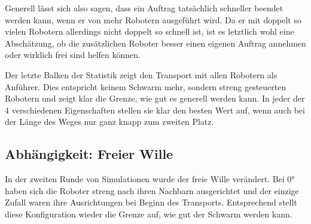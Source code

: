 Generell lässt sich also sagen, dass ein Auftrag tatsächlich schneller beendet werden kann, wenn er von mehr Robotern ausgeführt wird. Da er mit doppelt so vielen Robotern allerdings nicht doppelt so schnell ist, ist es letztlich wohl eine Abschätzung, ob die zusätzlichen Roboter besser einen eigenen Auftrag annehmen oder wirklich frei sind helfen können.

Der letzte Balken der Statistik zeigt den Transport mit allen Robotern als Anführer. Dies entspricht keinem Schwarm mehr, sondern streng gesteuerten Robotern und zeigt klar die Grenze, wie gut es generell werden kann. In jeder der 4 verschiedenen Eigenschaften stellen sie klar den besten Wert auf, wenn auch bei der Länge des Weges nur ganz knapp zum zweiten Platz.

\subsection*{Abhängigkeit: Freier Wille}

In der zweiten Runde von Simulationen wurde der freie Wille verändert. Bei 0° haben sich die Roboter streng nach ihren Nachbarn ausgerichtet und der einzige Zufall waren ihre Ausrichtungen bei Beginn des Transports. Entsprechend stellt diese Konfiguration wieder die Grenze auf, wie gut der Schwarm werden kann.

